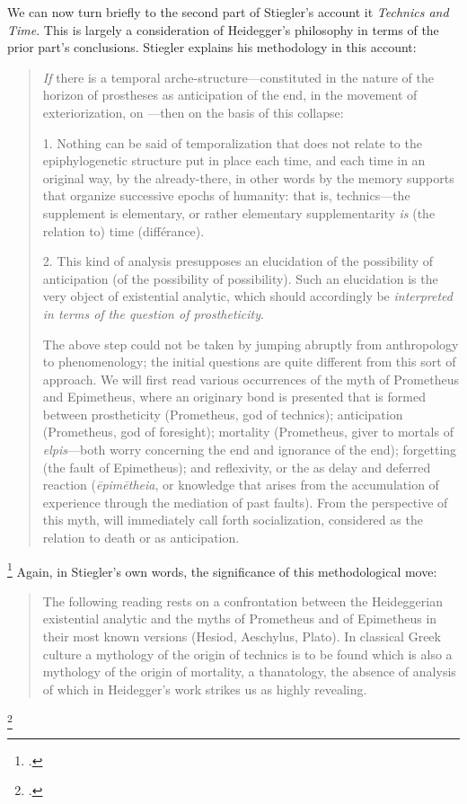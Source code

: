 \documentclass[letterpaper,notitlepage,12pt]{article}
\begin{document}
We can now turn briefly to the second part of Stiegler's account it
\textit{Technics and Time}.
This is largely a consideration of Heidegger's philosophy in terms of the prior
part's conclusions.
Stiegler explains his methodology in this account: \blockquote{\textit{If} there 
  is a temporal arche-structure---constituted in the  nature of the horizon of prostheses as anticipation of the end, in
the movement of exteriorization, on ---then on the basis of this collapse:

1. Nothing can be said of temporalization that does not relate to the
epiphylogenetic structure put in place each time, and each time in an
original way, by the already-there, in other words by the memory supports that 
organize successive epochs of humanity: that is, technics---the
supplement is elementary, or rather elementary supplementarity \textit{is} (the
relation to) time (diff\'{e}rance).

2. This kind of analysis presupposes an elucidation of the possibility
of anticipation (of the possibility of possibility). Such an elucidation is
the very object of existential analytic, which should accordingly be 
\textit{interpreted in terms of the question of prostheticity}.

The above step could not be taken by jumping abruptly from anthropology to 
phenomenology; the initial questions are quite different from this sort of 
approach. We will first read various occurrences of the myth
of Prometheus and Epimetheus, where an originary bond is presented
that is formed between prostheticity (Prometheus, god of technics); anticipation
(Prometheus, god of foresight); mortality (Prometheus, giver
to mortals of \textit{elpis}---both worry concerning the end and ignorance of the
end); forgetting (the fault of Epimetheus); and reflexivity, or the
 as delay and deferred reaction
(\textit{\={e}pim\={e}theia}, or knowledge that arises from the accumulation of 
experience through the mediation of past faults). From the perspective of this
myth,  will immediately call forth socialization, 
considered as the relation to death or as anticipation.}\footcite[p.
183--4]{stiegler_technics_1998}
Again, in Stiegler's own words, the significance of this methodological move:
\blockquote{The following reading rests on a confrontation between the 
  Heideggerian existential analytic and the myths of Prometheus and of
Epimetheus in their most known versions (Hesiod, Aeschylus, Plato). In
classical Greek culture a mythology of the origin of technics is to be
found which is also a mythology of the origin of mortality, a thanatology, the 
absence of analysis of which in Heidegger's work strikes us as
highly revealing.}\footcite[p. 16]{stiegler_technics_1998}
\end{document}
